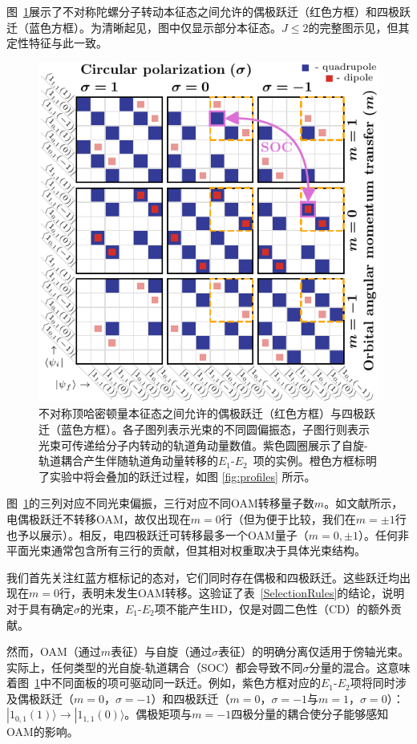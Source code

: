 \documentclass[reprint,aps,prl,twocolumn,superscriptaddress,groupedaddress]{revtex4-2}
\newcommand{\eoet}{$E_1$-$E_2$}
\begin{document}
\begin{CJK*}{UTF8}{gbsn}
图~\ref{fig:gridJ1}展示了不对称陀螺分子转动本征态之间允许的偶极跃迁（红色方框）和四极跃迁（蓝色方框）。为清晰起见，图中仅显示部分本征态。$J\leq 2$的完整图示见\cite{Note1}，但其定性特征与此一致。
\begin{figure}[ht!]
    \centering
    \includegraphics[width=\linewidth]{Figure1.pdf}
    \caption{不对称顶哈密顿量本征态之间允许的偶极跃迁（红色方框）与四极跃迁（蓝色方框）。各子图列表示光束的不同圆偏振态，子图行则表示光束可传递给分子内转动的轨道角动量数值。紫色圆圈展示了自旋-轨道耦合产生伴随轨道角动量转移的\eoet ~项的实例。橙色方框标明了实验中将会叠加的跃迁过程，如图 \ref{fig:profiles} 所示。}
    \label{fig:gridJ1}
\end{figure}
图~\ref{fig:gridJ1}的三列对应不同光束偏振，三行对应不同OAM转移量子数$m$。如文献\cite{Maslov2024,Maslov_Thesis}所示，电偶极跃迁不转移OAM，故仅出现在$m=0$行（但为便于比较，我们在$m=\pm 1$行也予以展示）。相反，电四极跃迁可转移最多一个OAM量子（$m=0,\pm 1$）。任何非平面光束通常包含所有三行的贡献，但其相对权重取决于具体光束结构。

我们首先关注红蓝方框标记的态对，它们同时存在偶极和四极跃迁。这些跃迁均出现在$m=0$行，表明未发生OAM转移。这验证了表~\ref{SelectionRules}的结论，说明对于具有确定$\sigma$的光束，\eoet 项不能产生HD，仅是对圆二色性（CD）的额外贡献。

然而，OAM（通过$m$表征）与自旋（通过$\sigma$表征）的明确分离仅适用于傍轴光束。实际上，任何类型的光自旋-轨道耦合（SOC）都会导致不同$\sigma$分量的混合\cite{Bliokh2015,Bliokh2023}。这意味着图~\ref{fig:gridJ1}中不同面板的项可驱动同一跃迁。例如，紫色方框对应的\eoet 项将同时涉及偶极跃迁（$m=0$，$\sigma=-1$）和四极跃迁（$m=0$，$\sigma=-1$与$m=1$，$\sigma=0$）：$| 1_{0,1}(1) \rangle \to | 1_{1,1}(0) \rangle$。偶极矩项与$m=-1$四极分量的耦合使分子能够感知OAM的影响。


\end{CJK*}
\end{document}
